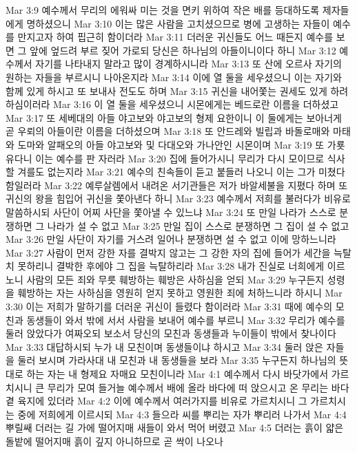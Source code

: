 Mar 3:9  예수께서 무리의 에워싸 미는 것을 면키 위하여 작은 배를 등대하도록 제자들에게 명하셨으니
Mar 3:10  이는 많은 사람을 고치셨으므로 병에 고생하는 자들이 예수를 만지고자 하여 핍근히 함이더라
Mar 3:11  더러운 귀신들도 어느 때든지 예수를 보면 그 앞에 엎드려 부르 짖어 가로되 당신은 하나님의 아들이니이다 하니
Mar 3:12  예수께서 자기를 나타내지 말라고 많이 경계하시니라
Mar 3:13  또 산에 오르사 자기의 원하는 자들을 부르시니 나아온지라
Mar 3:14  이에 열 둘을 세우셨으니 이는 자기와 함께 있게 하시고 또 보내사 전도도 하며
Mar 3:15  귀신을 내어쫓는 권세도 있게 하려 하심이러라
Mar 3:16  이 열 둘을 세우셨으니 시몬에게는 베드로란 이름을 더하셨고
Mar 3:17  또 세베대의 아들 야고보와 야고보의 형제 요한이니 이 둘에게는 보아너게 곧 우뢰의 아들이란 이름을 더하셨으며
Mar 3:18  또 안드레와 빌립과 바돌로매와 마태와 도마와 알패오의 아들 야고보와 및 다대오와 가나안인 시몬이며
Mar 3:19  또 가룟 유다니 이는 예수를 판 자러라
Mar 3:20  집에 들어가시니 무리가 다시 모이므로 식사할 겨를도 없는지라
Mar 3:21  예수의 친속들이 듣고 붙들러 나오니 이는 그가 미쳤다 함일러라
Mar 3:22  예루살렘에서 내려온 서기관들은 저가 바알세불을 지폈다 하며 또 귀신의 왕을 힘입어 귀신을 쫓아낸다 하니
Mar 3:23  예수께서 저희를 불러다가 비유로 말씀하시되 사단이 어찌 사단을 쫓아낼 수 있느냐
Mar 3:24  또 만일 나라가 스스로 분쟁하면 그 나라가 설 수 없고
Mar 3:25  만일 집이 스스로 분쟁하면 그 집이 설 수 없고
Mar 3:26  만일 사단이 자기를 거스려 일어나 분쟁하면 설 수 없고 이에 망하느니라
Mar 3:27  사람이 먼저 강한 자를 결박지 않고는 그 강한 자의 집에 들어가 세간을 늑탈치 못하리니 결박한 후에야 그 집을 늑탈하리라
Mar 3:28  내가 진실로 너희에게 이르노니 사람의 모든 죄와 무릇 훼방하는 훼방은 사하심을 얻되
Mar 3:29  누구든지 성령을 훼방하는 자는 사하심을 영원히 얻지 못하고 영원한 죄에 처하느니라 하시니
Mar 3:30  이는 저희가 말하기를 더러운 귀신이 들렸다 함이러라
Mar 3:31  때에 예수의 모친과 동생들이 와서 밖에 서서 사람을 보내어 예수를 부르니
Mar 3:32  무리가 예수를 둘러 앉았다가 여짜오되 보소서 당신의 모친과 동생들과 누이들이 밖에서 찾나이다
Mar 3:33  대답하시되 누가 내 모친이며 동생들이냐 하시고
Mar 3:34  둘러 앉은 자들을 둘러 보시며 가라사대 내 모친과 내 동생들을 보라
Mar 3:35  누구든지 하나님의 뜻대로 하는 자는 내 형제요 자매요 모친이니라
Mar 4:1  예수께서 다시 바닷가에서 가르치시니 큰 무리가 모여 들거늘 예수께서 배에 올라 바다에 떠 앉으시고 온 무리는 바다 곁 육지에 있더라
Mar 4:2  이에 예수께서 여러가지를 비유로 가르치시니 그 가르치시는 중에 저희에게 이르시되
Mar 4:3  들으라 씨를 뿌리는 자가 뿌리러 나가서
Mar 4:4  뿌릴쌔 더러는 길 가에 떨어지매 새들이 와서 먹어 버렸고
Mar 4:5  더러는 흙이 얇은 돌밭에 떨어지매 흙이 깊지 아니하므로 곧 싹이 나오나
